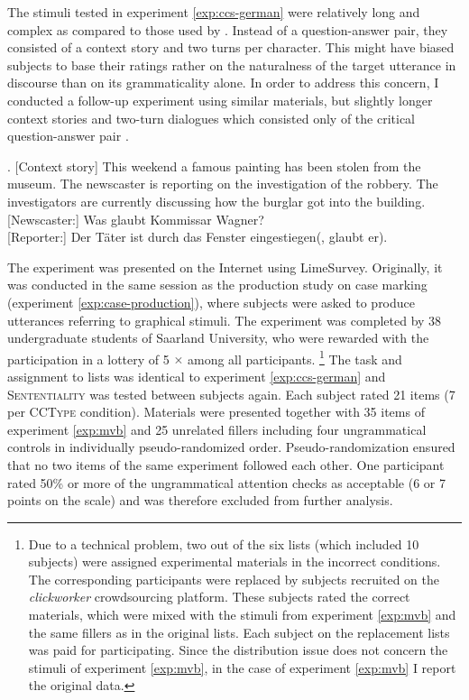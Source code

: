 The stimuli tested in experiment \ref{exp:ccs-german} were relatively long and complex as compared to those used by \citet{merchant.etal2013}. Instead of a question-answer pair, they consisted of a context story and two turns per character. This might have biased subjects to base their ratings rather on the naturalness of the target utterance in discourse than on its grammaticality alone. In order to address this concern, I conducted a follow-up experiment using similar materials, but slightly longer context stories and two-turn dialogues which consisted only of the critical question-answer pair \Next.

\ex. [Context story] This weekend a famous painting has been stolen from the museum. The newscaster is reporting on the investigation of the robbery. The investigators are currently discussing how the burglar got into the building.\\\mbox{}[Newscaster:] Was glaubt Kommissar Wagner?\\\mbox{}[Reporter:]  Der Täter ist durch das Fenster eingestiegen(, glaubt er).

The experiment was presented on the Internet using Lime\-Survey. Originally, it was conducted in the same session as the production study on case marking (experiment \ref{exp:case-production}), where subjects were asked to produce utterances referring to graphical stimuli. The experiment was completed by 38 undergraduate students of Saarland University, who were rewarded with the participation in a lottery of 5 $\times$  among all participants.%
%
\footnote{Due to a technical problem, two out of the six lists (which included 10 subjects) were assigned experimental materials in the incorrect conditions. The corresponding participants were replaced by subjects recruited on the \textit{clickworker} crowdsourcing platform. These subjects rated the correct materials, which were mixed with the stimuli from experiment \ref{exp:mvb} and the same fillers as in the original lists. Each subject on the replacement lists was paid  for participating. Since the distribution issue does not concern the stimuli of experiment \ref{exp:mvb}, in the case of experiment \ref{exp:mvb} I report the original data.}\afterfn%
%
The task and assignment to lists was identical to experiment \ref{exp:ccs-german} and \textsc{Sententiality} was tested between subjects again. Each subject rated 21 items (7 per \textsc{CCType} condition). Materials were presented together with 35 items of experiment \ref{exp:mvb} and 25 unrelated fillers including four ungrammatical controls in individually pseudo-randomized order. Pseudo-randomization ensured that no two items of the same experiment followed each other. One participant rated 50\% or more of the ungrammatical attention checks as acceptable (6 or 7 points on the scale) and was therefore excluded from further analysis.

